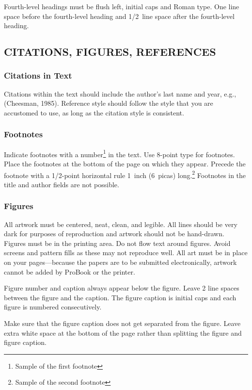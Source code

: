 Fourth-level headings must be flush left, initial caps and Roman type.
One line space before the fourth-level heading and 1/2~line space
after the fourth-level heading.

\subsection{CITATIONS, FIGURES, REFERENCES}

\subsubsection{Citations in Text}

Citations within the text should include the author's last name
and year, e.g., (Cheesman, 1985). Reference style should follow
the style that you are accustomed to use, as long as the citation
style is consistent.

\subsubsection{Footnotes}

Indicate footnotes with a number\footnote{Sample of the first
footnote} in the text. Use 8-point type for footnotes.  Place the
footnotes at the bottom of the page  on which they appear.   Precede
the footnote with a 1/2-point horizontal rule  1~inch (6~picas)
long.\footnote{Sample of the second footnote}
Footnotes in the title and author fields are not possible.

\subsubsection{Figures}

All artwork must be centered, neat, clean, and legible.  All lines
should be very dark for purposes of reproduction and artwork should
not be hand-drawn. Figures must be in the printing area. Do not flow
text around figures.
Avoid screens and pattern fills as these may not reproduce well.
All art must be in place on your pages---because the
papers are to be submitted electronically, artwork cannot be added by
ProBook or the printer.

Figure number and caption always appear below the figure.  Leave 2
line spaces between the figure and the caption. The figure caption is
initial caps and each figure is numbered consecutively.

Make sure that the figure caption does not get separated from the
figure. Leave extra white space at the bottom of the page rather than
splitting the figure and figure caption.

